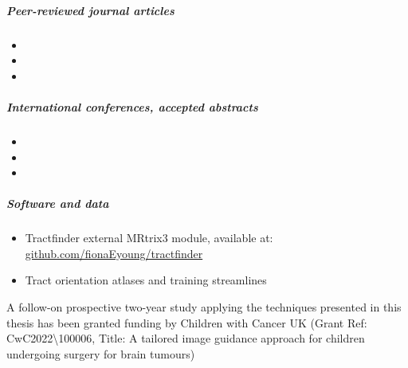 \subparagraph*{Peer-reviewed journal articles}
\begin{itemize}
  \item[] 
  \item[] 
  \item[] 
\end{itemize}

\subparagraph*{International conferences, accepted abstracts}
\begin{itemize}
  \item[] 
  \item[] 
  \item[] 
\end{itemize}

\subparagraph*{Software and data}
\begin{itemize}
  \item[] Tractfinder external MRtrix3 module, available at: \url{github.com/fionaEyoung/tractfinder}
  \item[] Tract orientation atlases and training streamlines 
\end{itemize}

\noindent A follow-on prospective two-year study applying the techniques presented in this thesis has been granted funding by Children with Cancer UK (Grant Ref: CwC2022\textbackslash100006, Title:  A tailored image guidance approach for children undergoing surgery for brain tumours)
